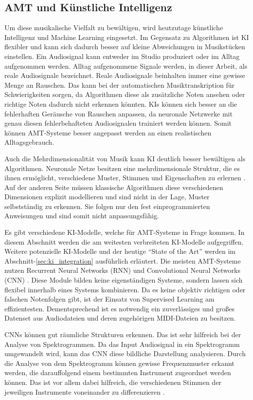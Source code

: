 \subsection{AMT und Künstliche Intelligenz}
Um diese musikalische Vielfalt zu bewältigen, wird heutzutage künstliche Intelligenz und Machine Learning eingesetzt.
Im Gegensatz zu Algorithmen ist KI flexibler und kann sich dadurch besser
auf kleine Abweichungen in Musikstücken einstellen.
Ein Audiosignal kann entweder im Studio produziert oder im Alltag aufgenommen werden.
Alltag aufgenommene Signale werden, in dieser Arbeit, als reale Audiosignale bezeichnet.
Reale Audiosignale beinhalten immer eine gewisse Menge an Rauschen.
Das kann bei der automatischen Musiktranskription für Schwierigkeiten sorgen,
da Algorithmen diese als zusätzliche Noten ansehen oder richtige Noten dadurch nicht erkennen könnten.
KIs können sich besser an die fehlerhaften Geräusche von Rauschen anpassen,
da neuronale Netzwerke mit genau diesen fehlerbehafteten Audiosignalen trainiert werden können.
Somit können AMT-Systeme besser angepasst werden an einen realistischen Alltagsgebrauch.

Auch die Mehrdimensionalität von Musik kann KI deutlich besser bewältigen als Algorithmen.
Neuronale Netze besitzen eine mehrdimensionale Struktur, die es ihnen ermöglicht,
verschiedene Muster, Stimmen und Eigenschaften zu erlernen \cite{graves2007multi}.
Auf der anderen Seite müssen klassische Algorithmen diese verschiedenen Dimensionen
explizit modellieren und sind nicht in der Lage, Muster selbstständig zu erkennen.
Sie folgen nur den fest einprogrammierten Anweisungen und sind somit nicht anpassungsfähig.

Es gibt verschiedene KI-Modelle, welche für AMT-Systeme in Frage kommen.
In diesem Abschnitt werden die am weitesten verbreiteten KI-Modelle aufgegriffen.
Weitere potenzielle KI-Modelle und der heutige
\enquote{State of the Art} werden im Abschnitt-\ref{sec:ki_integration} ausführlich erläutert.
Die meisten AMT-Systeme nutzen Recurrent Neural Networks (RNN) und Convolutional Neural Networks (CNN) \cite{Boeck2012}.
Diese Module bilden keine eigenständigen Systeme, sondern lassen sich flexibel innerhalb eines Systems kombinieren.
Da es keine objektiv richtigen oder falschen Notenfolgen gibt, ist der Einsatz von Supervised Learning am effizientesten.
Dementsprechend ist es notwendig ein zuverlässiges und großes Datenset aus Audiodateien und deren zugehörigen MIDI-Dateien zu besitzen.

CNNs können gut räumliche Strukturen erkennen.
Das ist sehr hilfreich bei der Analyse von Spektrogrammen.
Da das Input Audiosignal in ein Spektrogramm umgewandelt wird,
kann das CNN diese bildliche Darstellung analysieren.
Durch die Analyse von dem Spektrogramm können gewisse Frequenzmuster erkannt werden,
die darauffolgend einem bestimmten Instrument zugeordnet werden können.
Das ist vor allem dabei hilfreich, die verschiedenen Stimmen der jeweiligen Instrumente voneinander zu differenzieren \cite{han2016deep}.

